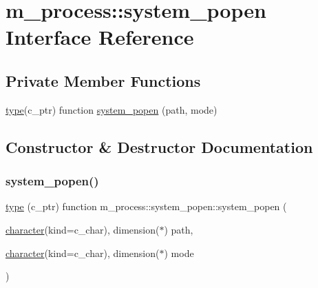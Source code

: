 \hypertarget{interfacem__process_1_1system__popen}{}\section{m\+\_\+process\+:\+:system\+\_\+popen Interface Reference}
\label{interfacem__process_1_1system__popen}
\subsection*{Private Member Functions}
\begin{DoxyCompactItemize}
\item 
\hyperlink{stop__watch_83_8txt_a70f0ead91c32e25323c03265aa302c1c}{type}(c\+\_\+ptr) function \hyperlink{interfacem__process_1_1system__popen_a45211cf49fdd755983b08ed6f3705bb1}{system\+\_\+popen} (path, mode)
\end{DoxyCompactItemize}


\subsection{Constructor \& Destructor Documentation}
\mbox{\label{interfacem__process_1_1system__popen_a45211cf49fdd755983b08ed6f3705bb1}} 
\subsubsection{\texorpdfstring{system\+\_\+popen()}{system\_popen()}}
{\footnotesize\ttfamily \hyperlink{stop__watch_83_8txt_a70f0ead91c32e25323c03265aa302c1c}{type} (c\+\_\+ptr) function m\+\_\+process\+::system\+\_\+popen\+::system\+\_\+popen (\begin{DoxyParamCaption}\item[{\hyperlink{option__stopwatch_83_8txt_abd4b21fbbd175834027b5224bfe97e66}{character}(kind=c\+\_\+char), dimension($\ast$)}]{path,  }\item[{\hyperlink{option__stopwatch_83_8txt_abd4b21fbbd175834027b5224bfe97e66}{character}(kind=c\+\_\+char), dimension($\ast$)}]{mode }\end{DoxyParamCaption})\hspace{0.3cm}{\ttfamily [private]}}



